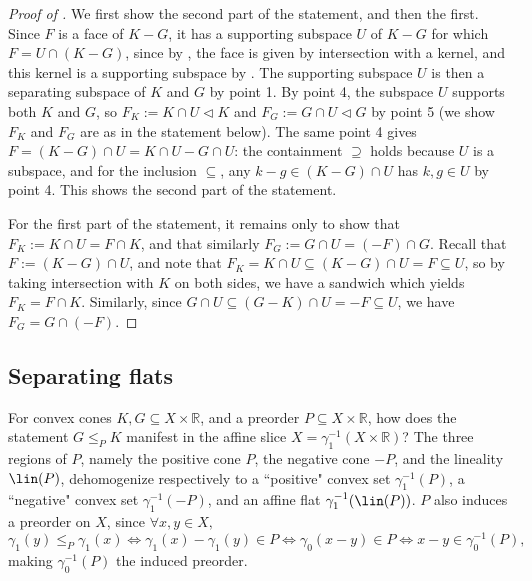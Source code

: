 \documentclass{article}
\theoremstyle{plain}
\theoremstyle{definition}
\theoremstyle{remark}
\begin{document}
\begin{proof}[\hypertarget{loc:decomposition_of_faces_of_difference_of_convex_cones.proof}{}Proof of ]

We first show the second part of the statement, and then the first.
Since $F$ is a face of $K-G$, it has a supporting subspace $U$ of $K-G$ for
which $F =  U \cap (K-G)$, since by , the face is given by intersection with a kernel, and this kernel is a supporting subspace by . The supporting subspace $U$ is then a separating subspace of $K$
and $G$ by  point 1.
By  point 4, the subspace $U$
supports both $K$ and $G$, so $F_K := K \cap U \triangleleft K$ and $F_G := G \cap U \triangleleft G$
by  point 5 (we show
$F_K$ and $F_G$ are as in the statement below).
The same point 4 gives $F = (K - G) \cap U = K \cap U - G \cap U$: the containment $\supseteq$ holds
because $U$ is a subspace, and for the inclusion $\subseteq$, any $k - g \in (K-G) \cap U$ has
$k, g \in U$ by  point 4. This
shows the second part of the statement.

For the first part of the statement, it remains only to show that $F_K := K \cap U = F \cap K$,
and that similarly $F_G := G \cap U = (-F) \cap G$.
Recall that $F := (K-G) \cap U$, and note that
$F_K = K \cap U \subseteq (K - G) \cap U = F \subseteq U$, so by taking intersection with $K$ on both sides, we have a sandwich which yields
$F_K = F \cap K$. Similarly, since $G \cap U \subseteq (G-K) \cap U = -F \subseteq U$, we have $F_G = G \cap (-F)$.
\end{proof}
\subsection{Separating flats}
\label{loc:body.separation.separating_flats}
For convex cones $K, G \subseteq X \times \mathbb{R}$, and a preorder $P \subseteq X \times \mathbb{R}$, how does the statement $G \le_{P} K$ manifest in the affine slice $X = \gamma_1^{-1}(X \times \mathbb{R})$?
The three regions of $P$, namely the positive cone $P$, the negative cone $-P$,
and the lineality $\lin(P)$, dehomogenize respectively to a ``positive" convex set
$\gamma_1^{-1}(P)$, a ``negative" convex set $\gamma_1^{-1}(-P)$, and an affine flat
$\gamma_1^{-1}(\lin(P))$. $P$ also induces a preorder on $X$, since $\forall x,y  \in X,$
\begin{equation*}
\gamma_1(y) \leq_{P} \gamma_1(x) \iff \gamma_1(x) -\gamma_1(y)  \in  P  \iff \gamma_0(x-y)  \in  P  \iff  x-y  \in  \gamma_0^{-1}(P),
\end{equation*}
making $\gamma_0^{-1}(P)$ the induced preorder.
\end{document}
